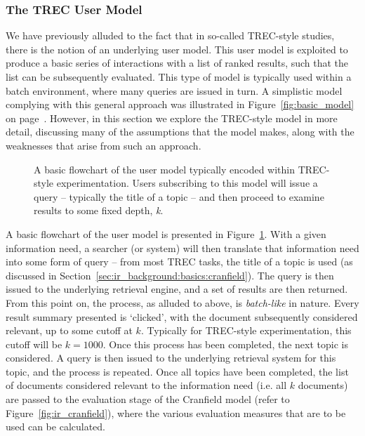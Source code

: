 \subsubsection{The TREC User Model}\label{sec:stopping_background:models:conceptual:trec}
We have previously alluded to the fact that in so-called TREC-style studies, there is the notion of an underlying user model. This user model is exploited to produce a basic series of interactions with a list of ranked results, such that the list can be subsequently evaluated. This type of model is typically used within a batch environment, where many queries are issued in turn. A simplistic model complying with this general approach was illustrated in Figure~\ref{fig:basic_model} on page~\pageref{fig:basic_model}. However, in this section we explore the TREC-style model in more detail, discussing many of the assumptions that the model makes, along with the weaknesses that arise from such an approach.

\begin{figure}[t!]
    \centering
    \caption[The TREC-style user model]{A basic flowchart of the user model typically encoded within TREC-style experimentation. Users subscribing to this model will issue a query – typically the title of a topic – and then proceed to examine results to some fixed depth, \emph{k}.}
    \label{fig:trec_model}
\end{figure}

A basic flowchart of the user model is presented in Figure~\ref{fig:trec_model}. With a given information need, a searcher (or system) will then translate that information need into some form of query -- from most TREC tasks, the title of a topic is used (as discussed in Section~\ref{sec:ir_background:basics:cranfield}). The query is then issued to the underlying retrieval engine, and a set of results are then returned. From this point on, the process, as alluded to above, is \emph{batch-like} in nature. Every result summary presented is `clicked', with the document subsequently considered relevant, up to some cutoff at $k$. Typically for TREC-style experimentation, this cutoff will be $k=1000$. Once this process has been completed, the next topic is considered. A query is then issued to the underlying retrieval system for this topic, and the process is repeated. Once all topics have been completed, the list of documents considered relevant to the information need (i.e. all $k$ documents) are passed to the evaluation stage of the Cranfield model (refer to Figure~\ref{fig:ir_cranfield}), where the various evaluation measures that are to be used can be calculated.

